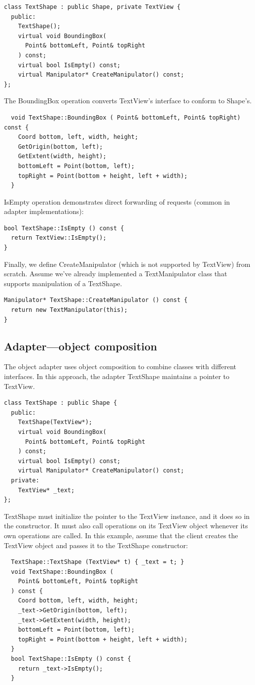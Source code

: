 \documentclass[11pt]{report}
\begin{document}
\begin{lstlisting}
class TextShape : public Shape, private TextView {
  public:
    TextShape();
    virtual void BoundingBox(
      Point& bottomLeft, Point& topRight
    ) const;
    virtual bool IsEmpty() const;
    virtual Manipulator* CreateManipulator() const;
};
\end{lstlisting}

The BoundingBox operation converts TextView's interface to conform to Shape's.
\begin{lstlisting}
  void TextShape::BoundingBox ( Point& bottomLeft, Point& topRight) const {
    Coord bottom, left, width, height;
    GetOrigin(bottom, left);
    GetExtent(width, height);
    bottomLeft = Point(bottom, left);
    topRight = Point(bottom + height, left + width);
  }
\end{lstlisting}

IsEmpty operation demonstrates direct forwarding of requests (common in adapter implementations):
\begin{lstlisting}
bool TextShape::IsEmpty () const {
  return TextView::IsEmpty();
}
\end{lstlisting}

Finally, we define CreateManipulator (which is not supported by TextView) from scratch. Assume 
we've already implemented a TextManipulator class that supports manipulation of a TextShape.
\begin{lstlisting}
Manipulator* TextShape::CreateManipulator () const {
  return new TextManipulator(this);
}
\end{lstlisting}

\subsection{Adapter---object composition}

The object adapter uses object composition to combine classes with different interfaces. 
In this approach, the adapter TextShape maintains a pointer to TextView.
\begin{lstlisting}
class TextShape : public Shape {
  public:
    TextShape(TextView*);
    virtual void BoundingBox(
      Point& bottomLeft, Point& topRight
    ) const;
    virtual bool IsEmpty() const;
    virtual Manipulator* CreateManipulator() const;
  private:
    TextView* _text;
};
\end{lstlisting}

TextShape must initialize the pointer to the TextView instance, and 
it does so in the constructor. It must also call operations on its TextView 
object whenever its own operations are called. In this example, 
assume that the client creates the TextView object and passes it 
to the TextShape constructor:
\begin{lstlisting}
  TextShape::TextShape (TextView* t) { _text = t; }
  void TextShape::BoundingBox (
    Point& bottomLeft, Point& topRight
  ) const {
    Coord bottom, left, width, height;
    _text->GetOrigin(bottom, left);
    _text->GetExtent(width, height);
    bottomLeft = Point(bottom, left);
    topRight = Point(bottom + height, left + width);
  }
  bool TextShape::IsEmpty () const {
    return _text->IsEmpty();
  }
\end{lstlisting}
\end{document}
